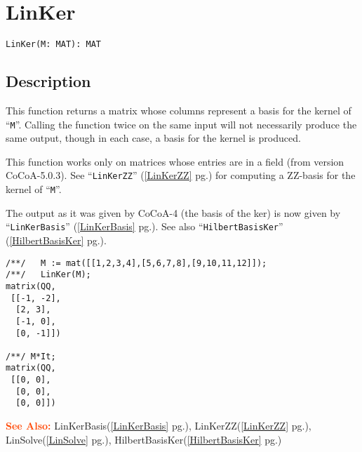 \documentclass[a4paper]{mybook}
\newenvironment{command}{}{} %
\newcommand\SeeAlso{\par\textcolor{OrangeRed}{\textbf{\large See Also: }}}
\begin{document}
\section{LinKer}
\label{LinKer}
\begin{command} %


\begin{Verbatim}[label=syntax, rulecolor=\color{MidnightBlue},
frame=single]
LinKer(M: MAT): MAT
\end{Verbatim}


\subsection*{Description}

This function returns a matrix whose columns represent a basis for
the kernel of ``\verb&M&''.  Calling the function twice on the same input will
not necessarily produce the same output, though in each case, a basis
for the kernel is produced.
\par 
This function works only on matrices whose entries are in a field
(from version CoCoA-5.0.3).  See ``\verb&LinKerZZ&'' (\ref{LinKerZZ} pg.\pageref{LinKerZZ}) for computing a
ZZ-basis for the kernel of ``\verb&M&''.
\par 
The output as it was given by CoCoA-4 (the basis of the ker) is
now given by ``\verb&LinKerBasis&'' (\ref{LinKerBasis} pg.\pageref{LinKerBasis}).  See also ``\verb&HilbertBasisKer&'' (\ref{HilbertBasisKer} pg.\pageref{HilbertBasisKer}).
\begin{Verbatim}[label=example, rulecolor=\color{PineGreen}, frame=single]
/**/   M := mat([[1,2,3,4],[5,6,7,8],[9,10,11,12]]);
/**/   LinKer(M);
matrix(QQ,
 [[-1, -2],
  [2, 3],
  [-1, 0],
  [0, -1]])

/**/ M*It;
matrix(QQ,
 [[0, 0],
  [0, 0],
  [0, 0]])
\end{Verbatim}


\SeeAlso %
  LinKerBasis(\ref{LinKerBasis} pg.\pageref{LinKerBasis}), 
    LinKerZZ(\ref{LinKerZZ} pg.\pageref{LinKerZZ}), 
    LinSolve(\ref{LinSolve} pg.\pageref{LinSolve}), 
    HilbertBasisKer(\ref{HilbertBasisKer} pg.\pageref{HilbertBasisKer})
\end{command} %
\end{document}

